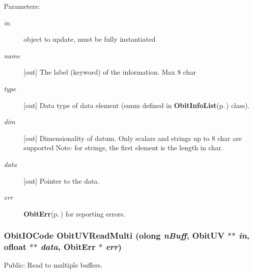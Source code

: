 \begin{Desc}
\item[Parameters:]
\begin{description}
\item[{\em in}]object to update, must be fully instantiated \item[{\em name}][out] The label (keyword) of the information. Max 8 char \item[{\em type}][out] Data type of data element (enum defined in {\bf Obit\-Info\-List}{\rm (p.\,\pageref{structObitInfoList})} class). \item[{\em dim}][out] Dimensionality of datum. Only scalars and strings up to 8 char are supported Note: for strings, the first element is the length in char. \item[{\em data}][out] Pointer to the data. \item[{\em err}]{\bf Obit\-Err}{\rm (p.\,\pageref{structObitErr})} for reporting errors. \end{description}
\end{Desc}
\subsubsection{\setlength{\rightskip}{0pt plus 5cm}Obit\-IOCode Obit\-UVRead\-Multi ({\bf olong} {\em n\-Buff}, {\bf Obit\-UV} $\ast$$\ast$ {\em in}, {\bf ofloat} $\ast$$\ast$ {\em data}, {\bf Obit\-Err} $\ast$ {\em err})}\label{ObitUV_8c_a23}


Public: Read to multiple buffers. 

